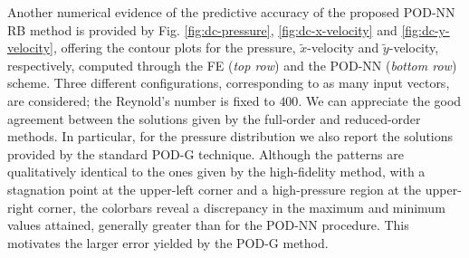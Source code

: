 \documentclass[12pt, a4paper, twoside, openright, notitlepage]{report}
\numberwithin{equation}{chapter}
\theoremstyle{theorem}
\theoremstyle{definition}
\theoremstyle{remark}
\theoremstyle{proposition}
\numberwithin{figure}{chapter}
\newcommand{\wt}[1]{\widetilde{#1}}
\begin{document}
		Another numerical evidence of the predictive accuracy of the proposed POD-NN RB method is provided by Fig. \ref{fig:dc-pressure}, \ref{fig:dc-x-velocity} and \ref{fig:dc-y-velocity}, offering the contour plots for the pressure, $\wt{x}$-velocity and $\wt{y}$-velocity, respectively, computed through the FE (\emph{top row}) and the POD-NN (\emph{bottom row}) scheme. Three different configurations, corresponding to as many input vectors, are considered; the Reynold's number is fixed to $400$. We can appreciate the good agreement between the solutions given by the full-order and reduced-order methods. In particular, for the pressure distribution we also report the solutions provided by the standard POD-G technique. Although the patterns are qualitatively identical to the ones given by the high-fidelity method, with a stagnation point at the upper-left corner and a high-pressure region at the upper-right corner, the colorbars reveal a discrepancy in the maximum and minimum values attained, generally greater than for the POD-NN procedure. This motivates the larger error yielded by the POD-G method.
		
\end{document}
